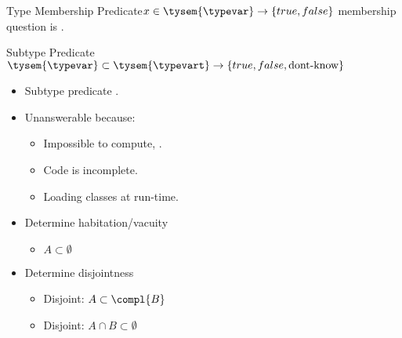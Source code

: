 


\newsavebox\membershipbox
\begin{lrbox}{\membershipbox}
  \begin{minipage}{11cm}
    
  \end{minipage}
\end{lrbox}

\begin{frame}{Type Membership Predicate}{$x \in \tysem{\typevar} \to \{true, false\}$}
   membership question is .

  \usebox\membershipbox
\end{frame}

\newsavebox\subtypebox
\begin{lrbox}{\subtypebox}
  \begin{minipage}{11cm}

  \end{minipage}
\end{lrbox}



\begin{frame}{Subtype Predicate}{$\tysem{\typevar}\subset\tysem{\typevart} \to \{true,false,\text{dont-know}\}$}
  \begin{itemize}
    
  \item   {} Subtype predicate .
    
    \usebox\subtypebox
    
  \item Unanswerable because:
    \begin{itemize}
    \item Impossible to compute, \eg {}.
    \item Code is incomplete.
    \item Loading classes at run-time.
    \end{itemize}
    
  \item Determine habitation/vacuity
    \begin{itemize}
    \item $A \subset \emptyset$
    \end{itemize}

  \item Determine disjointness
    \begin{itemize}
    \item Disjoint:  $A \subset \compl{B}$
    \item Disjoint: $A\cap B \subset \emptyset$
    \end{itemize}
  \end{itemize}
  
\end{frame}

